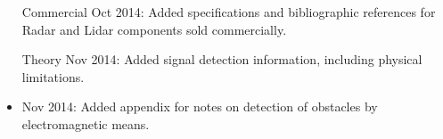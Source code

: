 \begin{itemize}
\item[Commercial] Oct 2014: Added specifications and bibliographic references for Radar and Lidar components sold commercially.
\item[Theory] Nov 2014: Added signal detection information, including physical limitations.
\item Nov 2014: Added appendix for notes on detection of obstacles by electromagnetic means.
\end{itemize}
